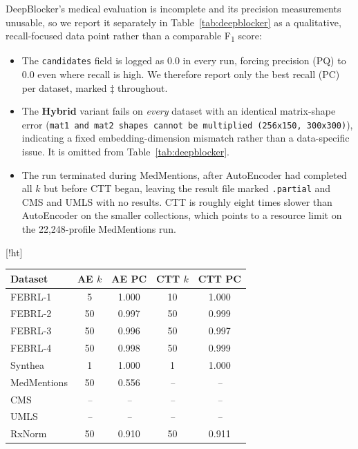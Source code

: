 \documentclass[runningheads]{llncs}
\makeatletter
\renewenvironment{table}
  {\setlength\abovecaptionskip{0\p@}%
   \setlength\belowcaptionskip{7\p@}%
   \@float{table}}
  {\end@float}
\makeatother
\begin{document}
DeepBlocker's medical evaluation is incomplete and its precision measurements unusable, so we
report it separately in Table~\ref{tab:deepblocker} as a qualitative, recall-focused data point
rather than a comparable F\textsubscript{1} score:
\begin{itemize}
    \item The \texttt{candidates} field is logged as $0.0$ in every run, forcing precision (PQ)
    to $0.0$ even where recall is high. We therefore report only the best recall (PC) per
    dataset, marked $\ddagger$ throughout.
    \item The \textbf{Hybrid} variant fails on \textit{every} dataset with an identical matrix-shape error (\texttt{mat1 and mat2 shapes cannot be multiplied 
    (256x150, 300x300)}), indicating a fixed embedding-dimension mismatch rather than a data-specific issue. It is omitted from Table~\ref{tab:deepblocker}.
    \item The run terminated during MedMentions, after AutoEncoder had completed all $k$ but
    before CTT began, leaving the result file marked \texttt{.partial} and CMS and UMLS with no
    results. CTT is roughly eight times slower than AutoEncoder on the smaller collections,
    which points to a resource limit on the 22{,}248-profile MedMentions run.
\end{itemize}

\begin{table}[!ht]
\centering
\caption{DeepBlocker best recall (PC$\ddagger$) per dataset and variant; precision is
unavailable (see text). PC is non-decreasing in $k$, so the reported $k$ is the smallest
attaining the maximum over $k \in \{1,5,10,50\}$, unlike the F\textsubscript{1}-maximizing $k$
elsewhere. ``--'' marks no result.}
\label{tab:deepblocker}
\begin{tabular}{lcccc}
\toprule
\textbf{Dataset} & \textbf{AE $k$} & \textbf{AE PC} & \textbf{CTT $k$} & \textbf{CTT PC} \\
\midrule
FEBRL-1      & 5  & 1.000 & 10 & 1.000 \\
FEBRL-2      & 50 & 0.997 & 50 & 0.999 \\
FEBRL-3      & 50 & 0.996 & 50 & 0.997 \\
FEBRL-4      & 50 & 0.998 & 50 & 0.999 \\
Synthea      & 1  & 1.000 & 1  & 1.000 \\
MedMentions  & 50 & 0.556 & \textit{--} & \textit{--} \\
CMS          & \textit{--} & \textit{--} & \textit{--} & \textit{--} \\
UMLS         & \textit{--} & \textit{--} & \textit{--} & \textit{--} \\
RxNorm       & 50 & 0.910 & 50 & 0.911 \\
\bottomrule
\end{tabular}
\end{table}
\end{document}
